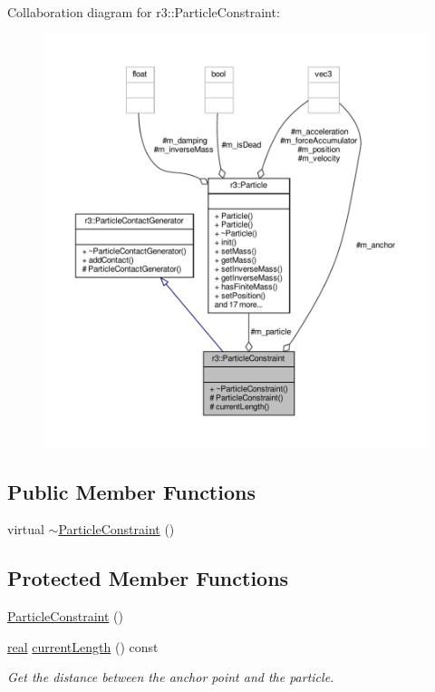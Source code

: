 Collaboration diagram for r3\+:\+:Particle\+Constraint\+:\nopagebreak
\begin{figure}[H]
\begin{center}
\leavevmode
\includegraphics[width=350pt]{classr3_1_1_particle_constraint__coll__graph}
\end{center}
\end{figure}
\subsection*{Public Member Functions}
\begin{DoxyCompactItemize}
\item 
virtual \mbox{\hyperlink{classr3_1_1_particle_constraint_aa4c9c88384c10a9e9613bdad843df524}{$\sim$\+Particle\+Constraint}} ()
\end{DoxyCompactItemize}
\subsection*{Protected Member Functions}
\begin{DoxyCompactItemize}
\item 
\mbox{\hyperlink{classr3_1_1_particle_constraint_af158845ecce7f53246f6120ad9dbd4b8}{Particle\+Constraint}} ()
\item 
\mbox{\hyperlink{namespacer3_ab2016b3e3f743fb735afce242f0dc1eb}{real}} \mbox{\hyperlink{classr3_1_1_particle_constraint_a0d466805c43b474d389609faba308cc0}{current\+Length}} () const
\begin{DoxyCompactList}\small\item\em Get the distance between the anchor point and the particle. \end{DoxyCompactList}\end{DoxyCompactItemize}
